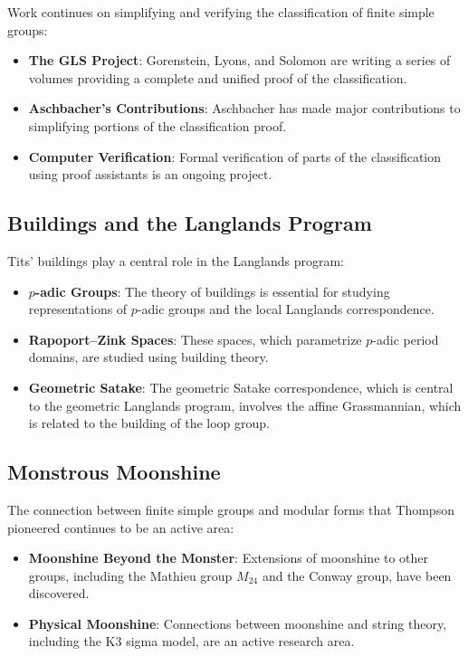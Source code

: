 Work continues on simplifying and verifying the classification of finite simple groups:

\begin{itemize}
\item \textbf{The GLS Project}: Gorenstein, Lyons, and Solomon are writing a series of volumes providing a complete and unified proof of the classification.

\item \textbf{Aschbacher's Contributions}: Aschbacher has made major contributions to simplifying portions of the classification proof.

\item \textbf{Computer Verification}: Formal verification of parts of the classification using proof assistants is an ongoing project.
\end{itemize}

\subsection{Buildings and the Langlands Program}

Tits' buildings play a central role in the Langlands program:

\begin{itemize}
\item \textbf{$p$-adic Groups}: The theory of buildings is essential for studying representations of $p$-adic groups and the local Langlands correspondence.

\item \textbf{Rapoport--Zink Spaces}: These spaces, which parametrize $p$-adic period domains, are studied using building theory.

\item \textbf{Geometric Satake}: The geometric Satake correspondence, which is central to the geometric Langlands program, involves the affine Grassmannian, which is related to the building of the loop group.
\end{itemize}

\subsection{Monstrous Moonshine}

The connection between finite simple groups and modular forms that Thompson pioneered continues to be an active area:

\begin{itemize}
\item \textbf{Moonshine Beyond the Monster}: Extensions of moonshine to other groups, including the Mathieu group $M_{24}$ and the Conway group, have been discovered.

\item \textbf{Physical Moonshine}: Connections between moonshine and string theory, including the K3 sigma model, are an active research area.
\end{itemize}


